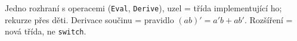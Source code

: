 \begin{jadro}
Jedno rozhraní s operacemi (\texttt{Eval}, \texttt{Derive}), uzel = třída implementující ho; rekurze přes děti. Derivace součinu = pravidlo $(ab)'=a'b+ab'$. Rozšíření = nová třída, ne \texttt{switch}.
\end{jadro}


